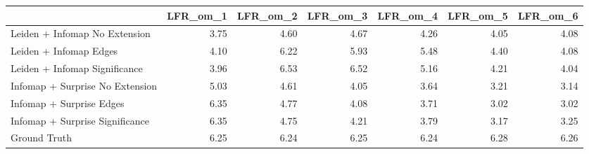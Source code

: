 \begin{tabular}{lrrrrrr}
\toprule
{} &  LFR\_om\_1 &  LFR\_om\_2 &  LFR\_om\_3 &  LFR\_om\_4 &  LFR\_om\_5 &  LFR\_om\_6 \\
\midrule
Leiden + Infomap No Extension   &      3.75 &      4.60 &      4.67 &      4.26 &      4.05 &      4.08 \\
Leiden + Infomap Edges          &      4.10 &      6.22 &      5.93 &      5.48 &      4.40 &      4.08 \\
Leiden + Infomap Significance   &      3.96 &      6.53 &      6.52 &      5.16 &      4.21 &      4.04 \\
Infomap + Surprise No Extension &      5.03 &      4.61 &      4.05 &      3.64 &      3.21 &      3.14 \\
Infomap + Surprise Edges        &      6.35 &      4.77 &      4.08 &      3.71 &      3.02 &      3.02 \\
Infomap + Surprise Significance &      6.35 &      4.75 &      4.21 &      3.79 &      3.17 &      3.25 \\
Ground Truth                    &      6.25 &      6.24 &      6.25 &      6.24 &      6.28 &      6.26 \\
\bottomrule
\end{tabular}
